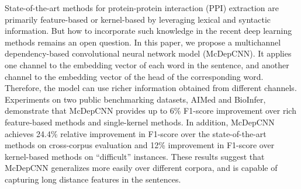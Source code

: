 State-of-the-art methods for protein-protein interaction (PPI) extraction are primarily feature-based or kernel-based by leveraging lexical and syntactic information. But how to incorporate such knowledge in the recent deep learning methods remains an open question. In this paper, we propose a multichannel dependency-based convolutional neural network model (McDepCNN). It applies one channel to the embedding vector of each word in the sentence, and another channel to the embedding vector of the head of the corresponding word. Therefore, the model can use richer information obtained from different channels. Experiments on two public benchmarking datasets, AIMed and BioInfer, demonstrate that McDepCNN provides up to 6\% F1-score improvement over rich feature-based methods and single-kernel methods. In addition, McDepCNN achieves 24.4\% relative improvement in F1-score over the state-of-the-art methods on cross-corpus evaluation and 12\% improvement in F1-score over kernel-based methods on ``difficult'' instances. These results suggest that McDepCNN generalizes more easily over different corpora, and is capable of capturing long distance features in the sentences.
